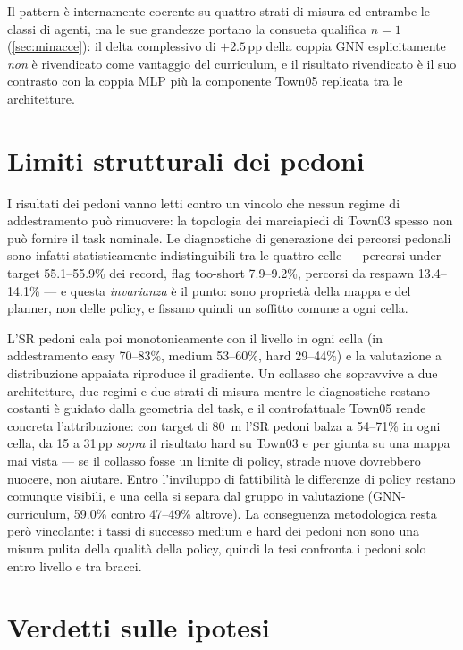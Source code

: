 Il pattern è internamente coerente su quattro strati di misura ed
entrambe le classi di agenti, ma le sue grandezze portano la consueta
qualifica $n{=}1$ (\cref{sec:minacce}): il delta complessivo di
$+2.5$\,pp della coppia GNN esplicitamente \emph{non} è rivendicato come
vantaggio del curriculum, e il risultato rivendicato è il suo contrasto
con la coppia MLP più la componente Town05 replicata tra le
architetture.

\section{Limiti strutturali dei pedoni}
\label{sec:pedoni}

I risultati dei pedoni vanno letti contro un vincolo che nessun regime
di addestramento può rimuovere: la topologia dei marciapiedi di Town03
spesso non può fornire il task nominale. Le diagnostiche di generazione
dei percorsi pedonali sono infatti statisticamente indistinguibili tra
le quattro celle --- percorsi under-target 55.1--55.9\% dei record, flag
too-short 7.9--9.2\%, percorsi da respawn 13.4--14.1\% --- e questa
\emph{invarianza} è il punto: sono proprietà della mappa e del planner,
non delle policy, e fissano quindi un soffitto comune a ogni cella.

L'SR pedoni cala poi monotonicamente con il livello in ogni cella (in
addestramento easy 70--83\%, medium 53--60\%, hard 29--44\%) e la
valutazione a distribuzione appaiata riproduce il gradiente. Un collasso
che sopravvive a due architetture, due regimi e due strati di misura
mentre le diagnostiche restano costanti è guidato dalla geometria del
task, e il controfattuale Town05 rende concreta l'attribuzione: con
target di \SI{80}{m} l'SR pedoni balza a 54--71\% in ogni cella, da 15 a
31\,pp \emph{sopra} il risultato hard su Town03 e per giunta su una
mappa mai vista --- se il collasso fosse un limite di policy, strade
nuove dovrebbero nuocere, non aiutare. Entro l'inviluppo di fattibilità
le differenze di policy restano comunque visibili, e una cella si separa
dal gruppo in valutazione (GNN-curriculum, 59.0\% contro 47--49\%
altrove). La conseguenza metodologica resta però vincolante: i tassi di
successo medium e hard dei pedoni non sono una misura pulita della
qualità della policy, quindi la tesi confronta i pedoni solo entro
livello e tra bracci.

\section{Verdetti sulle ipotesi}
\label{sec:verdetti}

